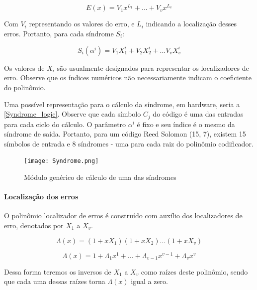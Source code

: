 	\begin{equation}
	E(x) = V_{1}x^{L_{1}} + ... + V_{v}x^{L_{v}}
	\end{equation}

	Com $V_{i}$ representando os valores do erro, e $L_{i}$ indicando a localização desses erros. Portanto, para cada síndrome $S_{i}$:

	\begin{equation}
	S_{i}(\alpha^{i}) = V_{1}X_{1}^{i} + V_{2}X_{2}^{i} + ... V_{v}X_{v}^{i}
	\end{equation}

	Os valores de $X_{i}$ são usualmente designados para representar os localizadores de erro. Observe que os índices numéricos não necessariamente indicam o coeficiente do polinômio.

	Uma possível representação para o cálculo da síndrome, em hardware, seria a \autoref{Syndrome_logic}. Observe que cada símbolo $C_{j}$ do código é uma das entradas para cada ciclo do cálculo. O parâmetro $\alpha^{i}$ é fixo e seu índice é o mesmo da síndrome de saída. Portanto, para um código Reed Solomon (15, 7), existem 15 símbolos de entrada e 8 síndromes - uma para cada raiz do polinômio codificador.

	\begin{figure}[!htb]
		\caption{\label{Syndrome_logic} Módulo genérico de cálculo de uma das síndromes}
		\centering
		\texttt{[image: Syndrome.png]}
	\end{figure}

	\paragraph*{Localização dos erros}

	O polinômio localizador de erros é construído com auxílio dos localizadores de erro, denotados por $X_{1}$ a $X_{v}$.

	\begin{equation}
	\Lambda(x) = (1 + xX_{1})(1 + xX_{2})...(1 + xX_{v})
	\end{equation}

	\begin{equation}
	\Lambda(x) =  1 + \Lambda_{1}x^{1} + ... + \Lambda_{v-1}x^{v-1} + \Lambda_{v}x^{v}
	\end{equation}

	Dessa forma teremos os inversos de $X_{1}$ a $X_{v}$ como raízes deste polinômio, sendo que cada uma dessas raízes torna $\Lambda(x)$ igual a zero.

